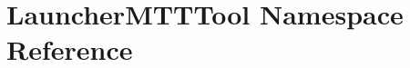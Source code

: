 \hypertarget{namespaceLauncherMTTTool}{\section{Launcher\-M\-T\-T\-Tool Namespace Reference}
\label{namespaceLauncherMTTTool}
}

